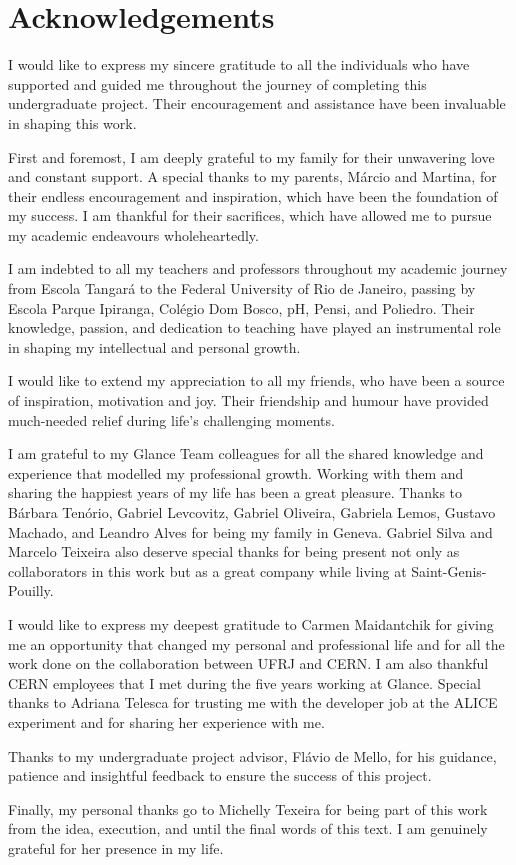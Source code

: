\chapter*{Acknowledgements}

I would like to express my sincere gratitude to all the individuals who have supported and guided me throughout the journey of completing this undergraduate project. Their encouragement and assistance have been invaluable in shaping this work.

First and foremost, I am deeply grateful to my family for their unwavering love and constant support. A special thanks to my parents, Márcio and Martina, for their endless encouragement and inspiration, which have been the foundation of my success. I am thankful for their sacrifices, which have allowed me to pursue my academic endeavours wholeheartedly.

I am indebted to all my teachers and professors throughout my academic journey from Escola Tangará to the Federal University of Rio de Janeiro, passing by Escola Parque Ipiranga, Colégio Dom Bosco, pH, Pensi, and Poliedro. Their knowledge, passion, and dedication to teaching have played an instrumental role in shaping my intellectual and personal growth.

I would like to extend my appreciation to all my friends, who have been a source of inspiration, motivation and joy. Their friendship and humour have provided much-needed relief during life's challenging moments.

I am grateful to my Glance Team colleagues for all the shared knowledge and experience that modelled my professional growth. Working with them and sharing the happiest years of my life has been a great pleasure. Thanks to Bárbara Tenório, Gabriel Levcovitz, Gabriel Oliveira, Gabriela Lemos, Gustavo Machado, and Leandro Alves for being my family in Geneva. Gabriel Silva and Marcelo Teixeira also deserve special thanks for being present not only as collaborators in this work but as a great company while living at Saint-Genis-Pouilly.

I would like to express my deepest gratitude to Carmen Maidantchik for giving me an opportunity that changed my personal and professional life and for all the work done on the collaboration between UFRJ and CERN. I am also thankful CERN employees that I met during the five years working at Glance. Special thanks to Adriana Telesca for trusting me with the developer job at the ALICE experiment and for sharing her experience with me.

Thanks to my undergraduate project advisor, Flávio de Mello, for his guidance, patience and insightful feedback to ensure the success of this project.

Finally, my personal thanks go to Michelly Texeira for being part of this work from the idea, execution, and until the final words of this text. I am genuinely grateful for her presence in my life. 
